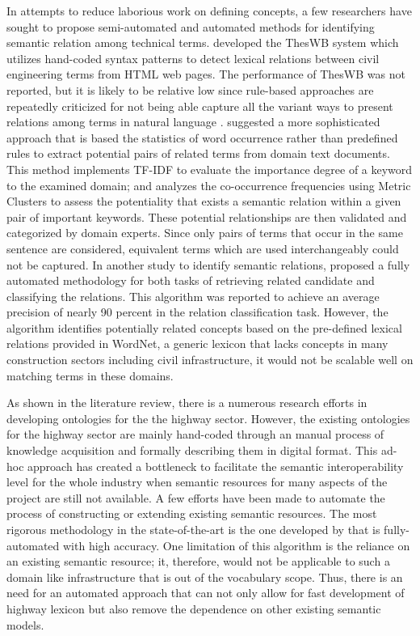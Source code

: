 \documentclass[Journal,InsideFigs, DoubleSpace]{ascelike} %
\begin{document}
In attempts to reduce laborious work on defining concepts, a few researchers have sought to propose semi-automated and automated methods for identifying semantic relation among technical terms.  developed the ThesWB system which utilizes hand-coded syntax patterns to detect lexical relations between civil engineering terms from HTML web pages. The performance of ThesWB was not reported, but it is likely to be relative low since rule-based approaches are repeatedly criticized for not being able capture all the variant ways to present relations among terms in natural language \cite{Marcus95,navigli10}.  suggested a more sophisticated approach that is based the statistics of word occurrence rather than predefined rules to extract potential pairs of related terms from domain text documents. This method implements TF-IDF to evaluate the importance degree of a keyword to the examined domain; and analyzes the co-occurrence frequencies using Metric Clusters to assess the potentiality that exists a semantic relation within a given pair of important keywords. These potential relationships are then validated and categorized by domain experts. Since only pairs of terms that occur in the same sentence are considered, equivalent terms which are used interchangeably could not be captured. In another study to identify semantic relations,  proposed a fully automated methodology for both tasks of retrieving related candidate and classifying the relations. This algorithm was reported to achieve an average precision of nearly 90 percent in the relation classification task. However, the algorithm identifies potentially related concepts based on the pre-defined lexical relations provided in WordNet, a generic lexicon that lacks concepts in many construction sectors including civil infrastructure, it would not be scalable well on matching terms in these domains.
\par
As shown in the literature review, there is a numerous research efforts in developing ontologies for the the highway sector. However, the existing ontologies for the highway sector are mainly hand-coded through an manual process of knowledge acquisition and formally describing them in digital format. This ad-hoc approach has created a bottleneck to facilitate the semantic interoperability level for the whole industry when semantic resources for many aspects of the project are still not available. A few efforts have been made to automate the process of constructing or extending existing semantic resources. The most rigorous methodology in the state-of-the-art is the one developed by  that is fully-automated with high accuracy. One limitation of this algorithm is the reliance on an existing semantic resource; it, therefore, would not be applicable to such a domain like infrastructure that is out of the vocabulary scope. Thus, there is an need for an automated approach that can not only allow for fast development of highway lexicon but also remove the dependence on other existing semantic models. 
\end{document}
